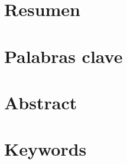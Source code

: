 \documentclass[12pt,letterpaper]{article}
\begin{document}


\begin{center}
  {\LARGE\bfseries \tituloES\par}
  \vspace{0.6em}
  {\Large\bfseries \tituloEN\par}
  \vspace{1.4em}
\end{center}

{\setlength{\parindent}{0pt}\bloqueAutores}

\section{Resumen}
\resumenES

\section{Palabras clave}
\palabrasclaveES

\section{Abstract}
\resumenEN

\section{Keywords}
\palabrasclaveEN








\printbibliography[heading=bibnumbered,title={Referencias}]
\end{document}
